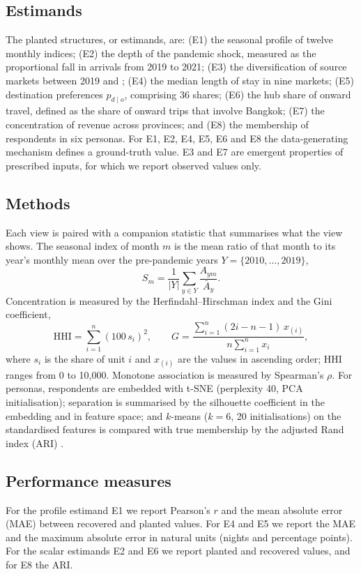 \documentclass{article}
\begin{document}
\subsection{Estimands}
The planted structures, or estimands, are: (E1) the seasonal profile of twelve monthly indices; (E2) the depth
of the pandemic shock, measured as the proportional fall in arrivals from 2019 to 2021; (E3) the
diversification of source markets between 2019 and \LatestYear; (E4) the median length of stay in nine
markets; (E5) destination preferences $p_{d\mid o}$, comprising 36 shares; (E6) the hub share of onward
travel, defined as the share of onward trips that involve Bangkok; (E7) the concentration of revenue across
provinces; and (E8) the membership of \SegN{} respondents in six personas. For E1, E2, E4, E5, E6 and E8 the
data-generating mechanism defines a ground-truth value. E3 and E7 are emergent properties of prescribed
inputs, for which we report observed values only.

\subsection{Methods}
Each view is paired with a companion statistic that summarises what the view shows. The seasonal index of
month $m$ is the mean ratio of that month to its year's monthly mean over the pre-pandemic years
$Y = \{2010, \dots, 2019\}$,
\begin{equation}
S_m = \frac{1}{|Y|} \sum_{y \in Y} \frac{A_{ym}}{\bar{A}_y}.
\end{equation}
Concentration is measured by the Herfindahl--Hirschman index and the Gini coefficient,
\begin{equation}
\mathrm{HHI} = \sum_{i=1}^{n} (100\, s_i)^2, \qquad
G = \frac{\sum_{i=1}^{n} (2i - n - 1)\, x_{(i)}}{n \sum_{i=1}^{n} x_i},
\end{equation}
where $s_i$ is the share of unit $i$ and $x_{(i)}$ are the values in ascending order; HHI ranges from 0 to
10{,}000. Monotone association is measured by Spearman's $\rho$. For personas, respondents are embedded with
t-SNE (perplexity 40, PCA initialisation); separation is summarised by the silhouette coefficient
\citep{rousseeuw1987} in the embedding and in feature space; and $k$-means ($k = 6$, 20 initialisations) on the
standardised features is compared with true membership by the adjusted Rand index (ARI) \citep{hubert1985}.

\subsection{Performance measures}
For the profile estimand E1 we report Pearson's $r$ and the mean absolute error (MAE) between recovered and
planted values. For E4 and E5 we report the MAE and the maximum absolute error in natural units (nights and
percentage points). For the scalar estimands E2 and E6 we report planted and recovered values, and for E8 the
ARI.
\end{document}

